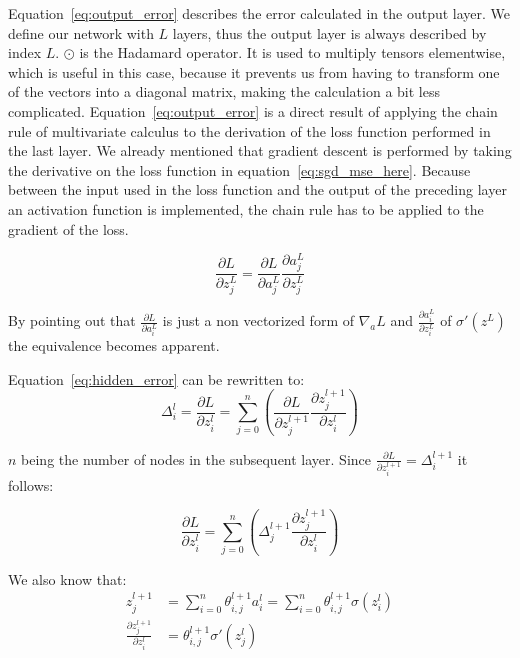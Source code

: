 Equation~\eqref{eq:output_error} describes the error calculated in the output layer. We define our network with $L$ layers, thus the output layer is always described by index $L$.
$\odot$ is the Hadamard operator. It is used to multiply tensors elementwise, which is useful in this case, because it prevents us from having to transform one of the vectors into a diagonal matrix, making the calculation a bit less complicated.
Equation~\eqref{eq:output_error} is a direct result of applying the chain rule of multivariate calculus to the derivation of the loss function performed in the last layer.
We already mentioned that gradient descent is performed by taking the derivative on the loss function in equation~\eqref{eq:sgd_mse_here}.
Because between the input used in the loss function and the output of the preceding layer an activation function is implemented, the chain rule has to be applied to the gradient of the loss.

\begin{equation}\label{eq:proof_loss_chain_rule}
    \frac{\partial L}{\partial z^L_j} = \frac{\partial L}{\partial a^L_j}\frac{\partial a^L_j}{\partial z^L_j}
\end{equation}

By pointing out that $\frac{\partial L}{\partial a^L_i}$ is just a non vectorized form of $\nabla_a L$ and $\frac{\partial a^L_i}{\partial z^L_i}$ of $\sigma'(z^L)$ the equivalence becomes apparent.

Equation~\eqref{eq:hidden_error} can be rewritten to:
\begin{equation}
    \varDelta^l_i = \frac{\partial L}{\partial z^l_i} = \sum_{j=0}^n (\frac{\partial L}{\partial z^{l+1}_j}\frac{\partial z^{l+1}_j}{\partial z^l_i})
\end{equation}

$n$ being the number of nodes in the subsequent layer. Since $\frac{\partial L}{\partial z^{l+1}_i} = \varDelta^{l+1}_i$ it follows:

\begin{equation} \label{eq:hidden_error_intermediate}
    \frac{\partial L}{\partial z^l_i} = \sum_{j=0}^n (\varDelta^{l+1}_j \frac{\partial z^{l+1}_j}{\partial z^{l}_i})
\end{equation}

We also know that:
\begin{equation}
    \begin{split}
    z^{l+1}_j & = \sum_{i=0}^n \theta^{l+1}_{i,j} a^l_i = \sum_{i=0}^n \theta^{l+1}_{i, j} \sigma(z^l_i) \\
    \frac{\partial z_j^{l+1}}{\partial z_i^l} & = \theta^{l+1}_{i,j} \sigma'(z^l_j)
    \end{split}
\end{equation}

